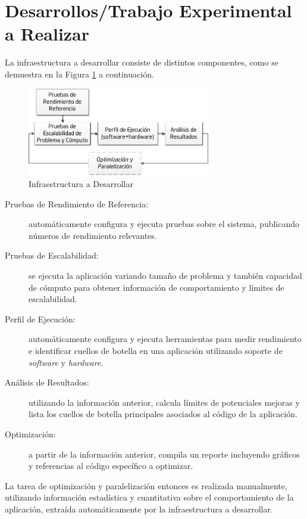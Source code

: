 \documentclass[a4paper]{article}
\begin{document}
\section{Desarrollos/Trabajo Experimental a Realizar}

La infraestructura a desarrollar consiste de distintos componentes, como se demuestra en la Figura \ref{fig:framework} a continuación.

\begin{figure}[H]
\centering
\includegraphics[width=8cm]{framework.png}
\caption{Infraestructura a Desarrollar}
\label{fig:framework}
\end{figure}
  \begin{description}
  \item[Pruebas de Rendimiento de Referencia:] automáticamente configura y ejecuta pruebas sobre el sistema, publicando números de rendimiento relevantes.
 \item[Pruebas de Escalabilidad:] se ejecuta la aplicación variando tamaño de problema y también capacidad de cómputo para obtener información de comportamiento y límites de escalabilidad.
  \item[Perfil de Ejecución:] automáticamente configura y ejecuta herramientas para medir rendimiento e identificar cuellos de botella en una aplicación utilizando soporte de {\it software} y {\it hardware}.
  \item[Análisis de Resultados:] utilizando la información anterior, calcula límites de potenciales mejoras y lista los cuellos de botella principales asociados al código de la aplicación.
  \item[Optimización:] a partir de la información anterior, compila un reporte incluyendo gráficos y referencias al código específico a optimizar.
  \end{description}

La tarea de optimización y paralelización entonces es realizada manualmente, utilizando información estadística y cuantitativa sobre el comportamiento de la aplicación, extraída automáticamente por la infraestructura a desarrollar. 

\bigskip
\end{document}
